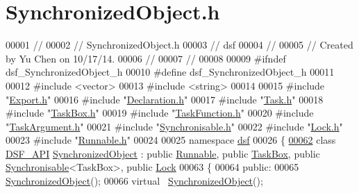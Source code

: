 \hypertarget{_synchronized_object_8h_source}{}\section{Synchronized\+Object.\+h}
\label{_synchronized_object_8h_source}

\begin{DoxyCode}
00001 \textcolor{comment}{//}
00002 \textcolor{comment}{//  SynchronizedObject.h}
00003 \textcolor{comment}{//  dsf}
00004 \textcolor{comment}{//}
00005 \textcolor{comment}{//  Created by Yu Chen on 10/17/14.}
00006 \textcolor{comment}{//}
00007 \textcolor{comment}{//}
00008 
00009 \textcolor{preprocessor}{#ifndef dsf\_SynchronizedObject\_h}
00010 \textcolor{preprocessor}{#define dsf\_SynchronizedObject\_h}
00011 
00012 \textcolor{preprocessor}{#include <vector>}
00013 \textcolor{preprocessor}{#include <string>}
00014 
00015 \textcolor{preprocessor}{#include "\hyperlink{dsf_2_export_8h}{Export.h}"}
00016 \textcolor{preprocessor}{#include "\hyperlink{_declaration_8h}{Declaration.h}"}
00017 \textcolor{preprocessor}{#include "\hyperlink{_task_8h}{Task.h}"}
00018 \textcolor{preprocessor}{#include "\hyperlink{_task_box_8h}{TaskBox.h}"}
00019 \textcolor{preprocessor}{#include "\hyperlink{_task_function_8h}{TaskFunction.h}"}
00020 \textcolor{preprocessor}{#include "\hyperlink{_task_argument_8h}{TaskArgument.h}"}
00021 \textcolor{preprocessor}{#include "\hyperlink{_synchronisable_8h}{Synchronisable.h}"}
00022 \textcolor{preprocessor}{#include "\hyperlink{_lock_8h}{Lock.h}"}
00023 \textcolor{preprocessor}{#include "\hyperlink{_runnable_8h}{Runnable.h}"}
00024 
00025 \textcolor{keyword}{namespace }\hyperlink{namespacedsf}{dsf}
00026 \{
\hypertarget{_synchronized_object_8h_source_l00062}{}\hyperlink{classdsf_1_1_synchronized_object}{00062}     \textcolor{keyword}{class }\hyperlink{dsf_2_export_8h_ad7bb940831423512f29a6981786c37bd}{DSF\_API} \hyperlink{classdsf_1_1_synchronized_object}{SynchronizedObject} : \textcolor{keyword}{public} \hyperlink{classdsf_1_1_runnable}{Runnable}, \textcolor{keyword}{public} 
      \hyperlink{classdsf_1_1_task_box}{TaskBox}, \textcolor{keyword}{public} \hyperlink{classdsf_1_1_synchronisable}{Synchronisable}<TaskBox>, \textcolor{keyword}{public} \hyperlink{classdsf_1_1_lock}{Lock}
00063     \{
00064     \textcolor{keyword}{public}:
00065         \hyperlink{namespacedsf_acbf1798fc56cfb1707162a17e13f5fda}{SynchronizedObject}();
00066         \textcolor{keyword}{virtual} ~\hyperlink{classdsf_1_1_synchronized_object}{SynchronizedObject}();

\end{DoxyCode}
